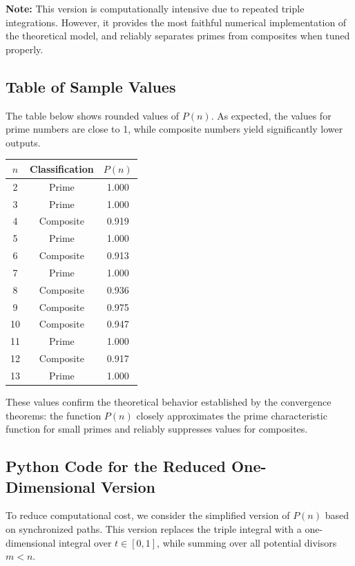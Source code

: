 \documentclass[12pt]{article}
\theoremstyle{definition}
\theoremstyle{plain}
\theoremstyle{remark}
\begin{document}
\textbf{Note:} This version is computationally intensive due to repeated triple integrations. However, it provides the most faithful numerical implementation of the theoretical model, and reliably separates primes from composites when tuned properly.

\subsection{Table of Sample Values}

The table below shows rounded values of \( P(n) \). As expected, the values for prime numbers are close to 1, while composite numbers yield significantly lower outputs.

\begin{center}
\begin{tabular}{|c|c|c|}
\hline
\( n \) & Classification & \( P(n) \) \\
\hline
2  & Prime     & 1.000 \\
3  & Prime     & 1.000 \\
4  & Composite & 0.919 \\
5  & Prime     & 1.000 \\
6  & Composite & 0.913 \\
7  & Prime     & 1.000 \\
8  & Composite & 0.936 \\
9  & Composite & 0.975 \\
10 & Composite & 0.947 \\
11 & Prime     & 1.000 \\
12 & Composite & 0.917 \\
13 & Prime     & 1.000 \\
\hline
\end{tabular}
\end{center}

These values confirm the theoretical behavior established by the convergence theorems: the function \( P(n) \) closely approximates the prime characteristic function for small primes and reliably suppresses values for composites.

\subsection{Python Code for the Reduced One-Dimensional Version}

To reduce computational cost, we consider the simplified version of \( P(n) \) based on synchronized paths. This version replaces the triple integral with a one-dimensional integral over \( t \in [0,1] \), while summing over all potential divisors \( m < n \).
\end{document}
